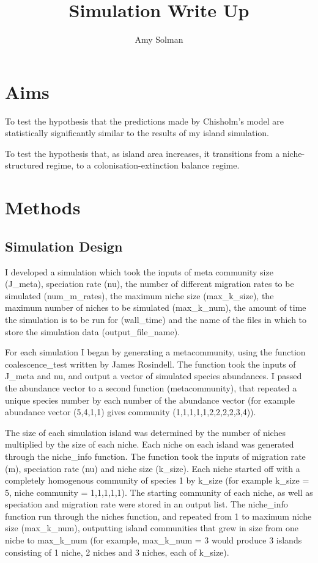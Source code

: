 \documentclass{article}
\begin{document}
\title{Simulation Write Up{}}
\author{Amy Solman}

\maketitle

\section{Aims}
To test the hypothesis that the predictions made by Chisholm’s model are statistically significantly similar to the results of my island simulation. 

To test the hypothesis that, as island area increases, it transitions from a niche-structured regime, to a colonisation-extinction balance regime. 

\section{Methods}

\subsection{Simulation Design}

I developed a simulation which took the inputs of meta community size (J\_meta), speciation rate (nu), the number of different migration rates to be simulated (num\_m\_rates), the maximum niche size (max\_k\_size), the maximum number of niches to be simulated (max\_k\_num), the amount of time the simulation is to be run for (wall\_time) and the name of the files in which to store the simulation data (output\_file\_name).\bigskip

For each simulation I began by generating a metacommunity, using the function coalescence\_test written by James Rosindell. The function took the inputs of J\_meta and nu, and output a vector of simulated species abundances. I passed the abundance vector to a second function (metacommunity), that repeated a unique species number by each number of the abundance vector (for example abundance vector (5,4,1,1) gives community (1,1,1,1,1,2,2,2,2,3,4)). \bigskip

The size of each simulation island was determined by the number of niches multiplied by the size of each niche. Each niche on each island was generated through the niche\_info function. The function took the inputs of migration rate (m), speciation rate (nu) and niche size (k\_size). Each niche started off with a completely homogenous community of species 1 by k\_size (for example k\_size = 5, niche community = 1,1,1,1,1). The starting community of each niche, as well as speciation and migration rate were stored in an output list. The niche\_info function run through the niches function, and repeated from 1 to maximum niche size (max\_k\_num), outputting island communities that grew in size from one niche to max\_k\_num (for example, max\_k\_num = 3 would produce 3 islands consisting of 1 niche, 2 niches and 3 niches, each of k\_size). \bigskip
\end{document}
